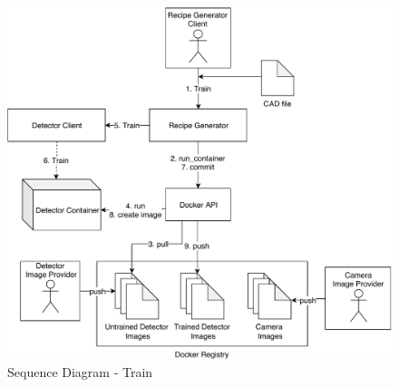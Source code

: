\begin{figure}[ht]
	\centering
  \includegraphics[width=\textwidth]{img/SequenceDiagram-Train.pdf}
	\caption{Sequence Diagram - Train}
	\label{fig:SequenceDiagram-Train}
\end{figure}

